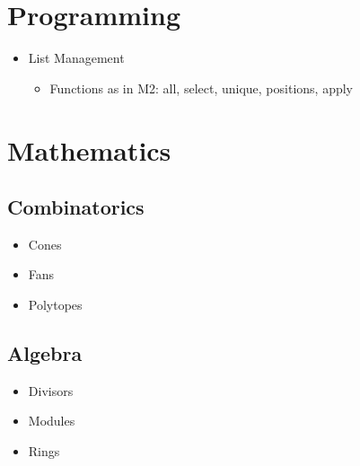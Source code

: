 \documentclass[a4paper]{article}
\begin{document}
\section{Programming}
\begin{itemize}
	\item[] List Management
	\begin{itemize}
		\item[] Functions as in M2: all, select, unique, positions, apply
	\end{itemize}
\end{itemize}
\section{Mathematics}
\subsection{Combinatorics}
\begin{itemize}
	\item[] Cones
	\item[] Fans
	\item[] Polytopes
\end{itemize}
\subsection{Algebra}
\begin{itemize}
	\item[] Divisors
	\item[] Modules
	\item[] Rings
\end{itemize}
\end{document}
